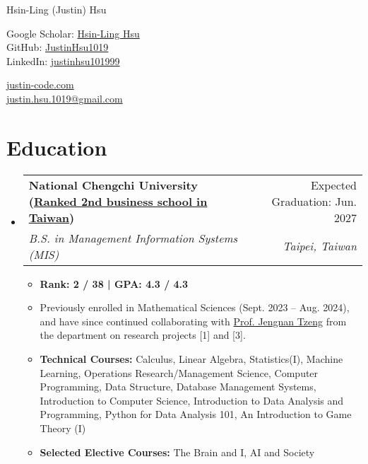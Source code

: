 \documentclass[letterpaper,10pt]{article}
\makeatletter
\newcommand{\resumeItem}[1]{
  \item\small{
    {#1 \vspace{-2pt}}
  }
}
\newcommand{\resumeSubheading}[4]{
  \vspace{-2pt}\item
    \begin{tabular*}{0.97\textwidth}[t]{l@{\extracolsep{\fill}}r}
      \textbf{#1} & #2 \\
      \textit{\small#3} & \textit{\small #4} \\
    \end{tabular*}\vspace{-7pt}
}
\newcommand{\resumeSubHeadingListStart}{\begin{itemize}[leftmargin=0.15in, label={}]}
\newcommand{\resumeSubHeadingListEnd}{\end{itemize}}
\newcommand{\resumeItemListStart}{\begin{itemize}}
\newcommand{\resumeItemListEnd}{\end{itemize}\vspace{-5pt}}
\makeatother
\begin{document}
\begin{center}
    {\LARGE Hsin-Ling (Justin) Hsu} \\ \vspace{2pt}
    \begin{multicols}{2}
    \begin{flushleft}
    Google Scholar: \href{{https://scholar.google.com/citations?user=pCXJM5AAAAAJ}}{Hsin-Ling Hsu} \\ \vspace{1pt}
    GitHub: \href{{https://github.com/justinHsu1019}}{JustinHsu1019}\\ \vspace{1pt}
    LinkedIn: \href{{https://www.linkedin.com/in/justinhsu101999}}{justinhsu101999}
    \end{flushleft}
    \begin{flushright}
    \href{{https://justin-code.com}}{justin-code.com}\\ \vspace{5pt}
    \href{mailto:justin.hsu.1019@gmail.com}{justin.hsu.1019@gmail.com}
    \end{flushright}
    \end{multicols}
\end{center}

\vspace{-2pt}
\section{Education}
  \resumeSubHeadingListStart
      \resumeSubheading
      {National Chengchi University \normalfont(\href{https://www.eduniversal-ranking.com/business-school-university-ranking-in-taiwan-region-china.html}{Ranked 2nd business school in Taiwan})}{Expected Graduation: Jun. 2027}
      {B.S. in Management Information Systems (MIS)}{Taipei, Taiwan}
      \resumeItemListStart
      \vspace{0.3em}
        \resumeItem{\textbf{Rank: 2 / 38 | GPA: 4.3 / 4.3}}
        \resumeItem{Previously enrolled in Mathematical Sciences (Sept. 2023 -- Aug. 2024), and have since continued collaborating with \href{https://ms.nccu.edu.tw/PageStaffing/Detail?fid=4666\&id=1118}{Prof. Jengnan Tzeng} from the department on research projects [1] and [3].}
        \resumeItem{\textbf{Technical Courses:} Calculus, Linear Algebra, Statistics(I), Machine Learning, Operations Research/Management Science, Computer Programming, Data Structure, Database Management Systems, Introduction to Computer Science, Introduction to Data Analysis and Programming, Python for Data Analysis 101, An Introduction to Game Theory (I)}
        \resumeItem{\textbf{Selected Elective Courses:} The Brain and I, AI and Society}
      \resumeItemListEnd
  \resumeSubHeadingListEnd
\end{document}
